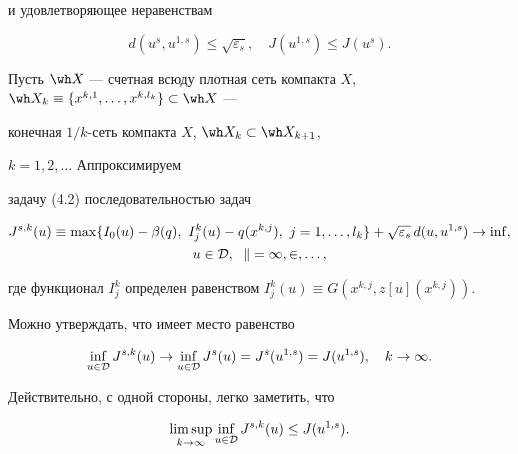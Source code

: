 и удовлетворяющее неравенствам 


\begin{equation} 


d(u^s,u^{1,s})\le\sqrt{\varepsilon_s},\quad 


J(u^{1,s})\le J(u^s). 


\end{equation} 


 


Пусть $\wh X$ --- счетная всюду плотная сеть компакта $X$, $\wh 


X_k\equiv\{x^{k,1},\dotsc,x^{k,l_k}\}\subset\wh X$ --- 


конечная $1/k$-сеть компакта $X$, $\wh X_k\subset\wh X_{k+1}$, 


$k=1,2,\dotsc$ Аппроксимируем 


задачу (4.2) последовательностью задач 


\begin{gather*} 


J^{s,k}(u)\equiv\max\{I_0(u)-\beta(q), 


\ I^k_j(u)-q(x^{k,j}),\ j=1,\dotsc,l_k\}+ 


\sqrt{\varepsilon_s}\,d(u,u^{1,s})\to\inf,\\ 


u\in\cal D,\ \; k=1,2,\dotsc, 


\end{gather*} 


где функционал $I^k_j$ определен равенством $I^k_j(u)\equiv 


G(x^{k,j},z[u](x^{k,j}))$. 


Можно утверждать, что имеет место равенство 


\begin{equation} 


\inf_{u\in\cal D}J^{s,k}(u)\to\inf_{u\in\cal D}J^s(u) 


=J^s(u^{1,s})=J(u^{1,s}),\quad k\to\infty. 


\end{equation} 


Действительно, с одной стороны, легко заметить, что 


\begin{equation} 


\limsup_{k\to\infty}\inf_{u\in\cal D} 


J^{s,k}(u)\le J(u^{1,s}). 


\end{equation} 


